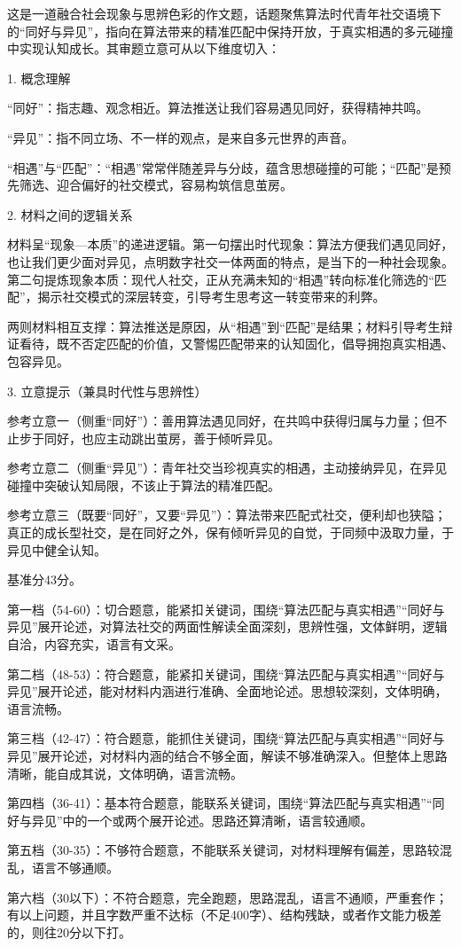\documentclass[11pt,a4paper]{ctexart}
\begin{document}

这是一道融合社会现象与思辨色彩的作文题，话题聚焦算法时代青年社交语境下的“同好与异见”，指向在算法带来的精准匹配中保持开放，于真实相遇的多元碰撞中实现认知成长。其审题立意可从以下维度切入：

1. 概念理解

“同好”：指志趣、观念相近。算法推送让我们容易遇见同好，获得精神共鸣。

“异见”：指不同立场、不一样的观点，是来自多元世界的声音。

“相遇”与“匹配”：“相遇”常常伴随差异与分歧，蕴含思想碰撞的可能；“匹配”是预先筛选、迎合偏好的社交模式，容易构筑信息茧房。

2. 材料之间的逻辑关系

材料呈“现象—本质”的递进逻辑。第一句摆出时代现象：算法方便我们遇见同好，也让我们更少面对异见，点明数字社交一体两面的特点，是当下的一种社会现象。第二句提炼现象本质：现代人社交，正从充满未知的“相遇”转向标准化筛选的“匹配”，揭示社交模式的深层转变，引导考生思考这一转变带来的利弊。

两则材料相互支撑：算法推送是原因，从“相遇”到“匹配”是结果；材料引导考生辩证看待，既不否定匹配的价值，又警惕匹配带来的认知固化，倡导拥抱真实相遇、包容异见。

3. 立意提示（兼具时代性与思辨性）

参考立意一（侧重“同好”）：善用算法遇见同好，在共鸣中获得归属与力量；但不止步于同好，也应主动跳出茧房，善于倾听异见。

参考立意二（侧重“异见”）：青年社交当珍视真实的相遇，主动接纳异见，在异见碰撞中突破认知局限，不该止于算法的精准匹配。

参考立意三（既要“同好”，又要“异见”）：算法带来匹配式社交，便利却也狭隘；真正的成长型社交，是在同好之外，保有倾听异见的自觉，于同频中汲取力量，于异见中健全认知。

基准分43分。

第一档（54-60）：切合题意，能紧扣关键词，围绕“算法匹配与真实相遇”“同好与异见”展开论述，对算法社交的两面性解读全面深刻，思辨性强，文体鲜明，逻辑自洽，内容充实，语言有文采。

第二档（48-53）：符合题意，能紧扣关键词，围绕“算法匹配与真实相遇”“同好与异见”展开论述，能对材料内涵进行准确、全面地论述。思想较深刻，文体明确，语言流畅。

第三档（42-47）：符合题意，能抓住关键词，围绕“算法匹配与真实相遇”“同好与异见”展开论述，对材料内涵的结合不够全面，解读不够准确深入。但整体上思路清晰，能自成其说，文体明确，语言流畅。

第四档（36-41）：基本符合题意，能联系关键词，围绕“算法匹配与真实相遇”“同好与异见”中的一个或两个展开论述。思路还算清晰，语言较通顺。

第五档（30-35）：不够符合题意，不能联系关键词，对材料理解有偏差，思路较混乱，语言不够通顺。

第六档（30以下）：不符合题意，完全跑题，思路混乱，语言不通顺，严重套作；有以上问题，并且字数严重不达标（不足400字）、结构残缺，或者作文能力极差的，则往20分以下打。
\end{document}
